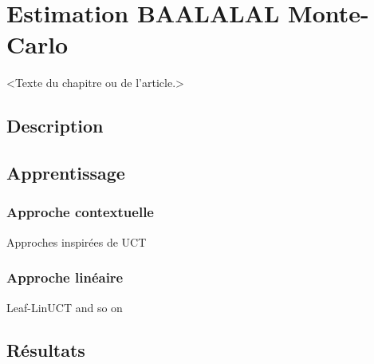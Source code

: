 \chapter{Estimation BAALALAL Monte-Carlo}
\label{chap:mcs}                   %

<Texte du chapitre ou de l'article.>

\section{Description}

\section{Apprentissage}

\subsection{Approche contextuelle}

Approches inspirées de UCT

\subsection{Approche linéaire}

Leaf-LinUCT and so on

\section{Résultats}
